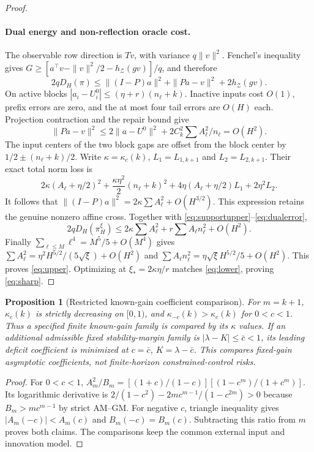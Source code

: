 \documentclass[11pt]{article}
\newtheorem{proposition}{Proposition}
\begin{document}
\begin{proof}
\paragraph{Dual energy and non-reflection oracle cost.}
The observable row direction is $Tv$, with variance $q\|v\|^2$.
Fenchel's inequality gives
$G\ge[a^\top v-\|v\|^2/2-h_{\mathcal Z}(gv)]/q$, and therefore
\begin{equation}\label{eq:dualerror}
2qD_H(\pi)\le
\|(I-P)a\|^2+\|Pa-v\|^2+2h_{\mathcal Z}(gv).
\end{equation}
On active blocks $|a_i-U_i^0|\le(\eta+r)(n_\ell+k)$.
Inactive inputs cost $O(1)$, prefix errors are zero, and the at most four
tail errors are $O(H)$ each. Projection contraction and the repair bound give
\[
\|Pa-v\|^2\le2\|a-U^0\|^2+2C_k^2\sum A_\ell^2/n_\ell=O(H^2).
\]
The input centers of the two block gaps are offset from the block center by
$1/2\pm(n_\ell+k)/2$.
Write $\kappa=\kappa_c(k)$, $L_1=L_{1,k+1}$ and $L_2=L_{2,k+1}$.
Their exact total norm loss is
\[
2\kappa(A_\ell+\eta/2)^2+\frac{\kappa\eta^2}{2}(n_\ell+k)^2
+4\eta(A_\ell+\eta/2)L_1+2\eta^2L_2.
\]
It follows that
$\|(I-P)a\|^2=2\kappa\sum A_\ell^2+O(H^{3/2})$.
This expression retains the genuine nonzero affine cross.
Together with \eqref{eq:supportupper}--\eqref{eq:dualerror},
\[
2qD_H(\pi_H^\xi)\le2\kappa\sum A_\ell^2+r\sum A_\ell n_\ell^2+O(H^2).
\]
Finally $\sum_{\ell\le M}\ell^4=M^5/5+O(M^4)$ gives
$\sum A_\ell^2=\eta^2H^{5/2}/(5\sqrt\xi)+O(H^2)$ and
$\sum A_\ell n_\ell^2=\eta\sqrt\xi H^{5/2}/5+O(H^2)$.
This proves \eqref{eq:upper}. Optimizing at $\xi_*=2\kappa\eta/r$ matches
\eqref{eq:lower}, proving \eqref{eq:sharp}.
\end{proof}

\begin{proposition}[Restricted known-gain coefficient comparison]
For $m=k+1$, $\kappa_c(k)$ is strictly decreasing on $[0,1)$, and
$\kappa_{-c}(k)>\kappa_c(k)$ for $0<c<1$.
Thus a specified finite known-gain family is compared by its $\kappa$ values.
If an additional admissible fixed stability-margin family is
$|\lambda-K|\le\bar c<1$, its leading deficit coefficient is minimized at
$c=\bar c$, $K=\lambda-\bar c$. This compares fixed-gain asymptotic
coefficients, not finite-horizon constrained-control risks.
\end{proposition}
\begin{proof}
For $0<c<1$,
$A_m^2/B_m=[(1+c)/(1-c)][(1-c^m)/(1+c^m)]$.
Its logarithmic derivative is
$2/(1-c^2)-2mc^{m-1}/(1-c^{2m})>0$ because
$B_m>mc^{m-1}$ by strict AM--GM.
For negative $c$, triangle inequality gives
$|A_m(-c)|<A_m(c)$ and $B_m(-c)=B_m(c)$.
Subtracting this ratio from $m$ proves both claims.
The comparisons keep the common external input and innovation model.
\end{proof}
\end{document}
